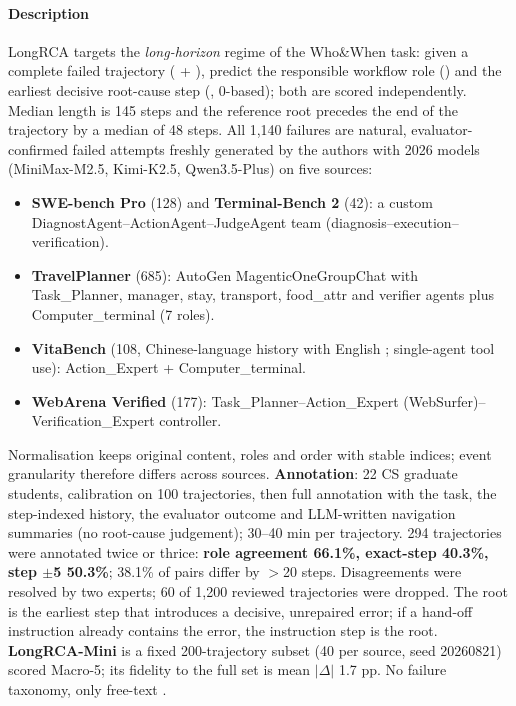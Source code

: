 \paragraph{Description} LongRCA targets the \emph{long-horizon} regime of the Who\&When task: given a complete failed trajectory ( + ), predict the responsible workflow role () and the earliest decisive root-cause step (, 0-based); both are scored independently. Median length is 145 steps and the reference root precedes the end of the trajectory by a median of 48 steps. All 1,140 failures are natural, evaluator-confirmed failed attempts freshly generated by the authors with 2026 models (MiniMax-M2.5, Kimi-K2.5, Qwen3.5-Plus) on five sources:
\begin{itemize}
\item \textbf{SWE-bench Pro} (128) and \textbf{Terminal-Bench 2} (42): a custom DiagnostAgent--ActionAgent--JudgeAgent team (diagnosis--execution--verification).
\item \textbf{TravelPlanner} (685): AutoGen MagenticOneGroupChat with Task\_Planner, manager, stay, transport, food\_attr and verifier agents plus Computer\_terminal (7 roles).
\item \textbf{VitaBench} (108, Chinese-language history with English ; single-agent tool use): Action\_Expert + Computer\_terminal.
\item \textbf{WebArena Verified} (177): Task\_Planner--Action\_Expert (WebSurfer)--Verification\_Expert controller.
\end{itemize}
Normalisation keeps original content, roles and order with stable indices; event granularity therefore differs across sources. \textbf{Annotation}: 22 CS graduate students, calibration on 100 trajectories, then full annotation with the task, the step-indexed history, the evaluator outcome and LLM-written navigation summaries (no root-cause judgement); 30--40 min per trajectory. 294 trajectories were annotated twice or thrice: \textbf{role agreement 66.1\%, exact-step 40.3\%, step $\pm$5 50.3\%}; 38.1\% of pairs differ by $>$20 steps. Disagreements were resolved by two experts; 60 of 1,200 reviewed trajectories were dropped. The root is the earliest step that introduces a decisive, unrepaired error; if a hand-off instruction already contains the error, the instruction step is the root. \textbf{LongRCA-Mini} is a fixed 200-trajectory subset (40 per source, seed 20260821) scored Macro-5; its fidelity to the full set is mean $|\Delta|$ 1.7 pp. No failure taxonomy, only free-text .

